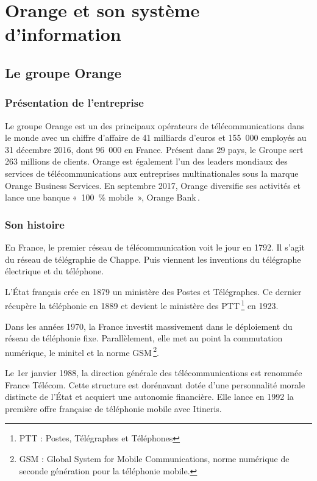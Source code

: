 \section{Orange et son système d'information}
\label{p1}

    \subsection{Le groupe Orange}

        \subsubsection{Présentation de l'entreprise}

        Le groupe Orange est un des principaux opérateurs de télécommunications dans le monde avec un chiffre d’affaire de 41 milliards d’euros et 155 000 employés au 31 décembre 2016, dont 96 000 en France.
        Présent dans 29 pays, le Groupe sert 263 millions de clients.
        Orange est également l’un des leaders mondiaux des services de télécommunications aux entreprises multinationales sous la marque Orange Business Services.
        En septembre 2017, Orange diversifie ses activités et lance une banque « 100 \% mobile », Orange Bank\,.

        \subsubsection{Son histoire}

        En France, le premier réseau de télécommunication voit le jour en 1792.
        Il s’agit du réseau de télégraphie de Chappe.
        Puis viennent les inventions du télégraphe électrique et du téléphone.

        L’État français crée en 1879 un ministère des Postes et Télégraphes.
        Ce dernier récupère la téléphonie en 1889 et devient le ministère des PTT\,\footnote{PTT : Postes, Télégraphes et Téléphones} en 1923.

        Dans les années 1970, la France investit massivement dans le déploiement du réseau de téléphonie fixe.
        Parallèlement, elle met au point la commutation numérique, le minitel et la norme GSM\,\footnote{GSM : \foreignlanguage{english}{Global System for Mobile Communications}, norme numérique de seconde génération pour la téléphonie mobile.}.

        Le 1er janvier 1988, la direction générale des télécommunications est renommée France Télécom.
        Cette structure est dorénavant dotée d'une personnalité morale distincte de l'État et acquiert une autonomie financière.
        Elle lance en 1992 la première offre française de téléphonie mobile avec Itineris.


